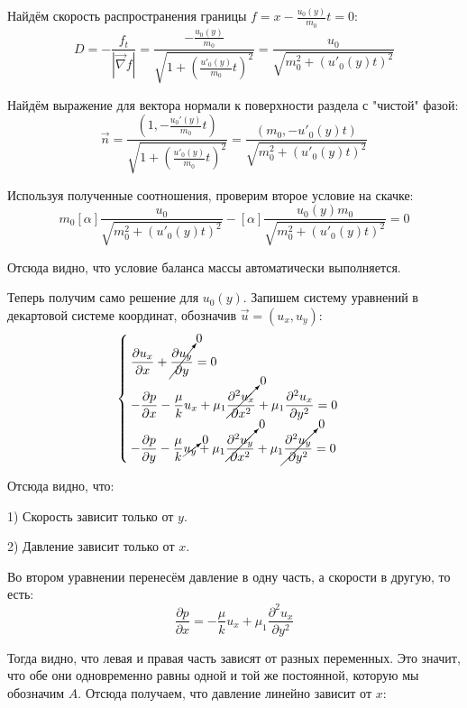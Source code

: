 \par Найдём скорость распространения границы $f = x-\frac{u_{0}(y)}{m_{0}}t=0$:
$$D=-\frac{f_{t}}{|\vec{\nabla}f|}=\frac{-\frac{u_{0}(y)}{m_{0}}}{\sqrt{1+(\frac{u'_{0}(y)}{m_{0}}t)^{2}}}=\frac{u_{0}}{\sqrt{m_{0}^{2}+(u'_{0}(y)t)^{2}}}$$
\par Найдём выражение для вектора нормали к поверхности раздела с "чистой" фазой:
$$\vec{n}=\frac{(1,-\frac{u_{0}'(y)}{m_{0}}t)}{\sqrt{1+(\frac{u'_{0}(y)}{m_{0}}t)^{2}}}=\frac{(m_{0}, -u'_{0}(y)t)}{\sqrt{m_{0}^{2}+(u'_{0}(y)t)^{2}}}$$
\par Используя полученные соотношения, проверим второе условие на скачке:
$$m_{0}[\alpha]\frac{u_{0}}{\sqrt{m_{0}^{2}+(u'_{0}(y)t)^{2}}}-[\alpha]\frac{u_{0}(y)m_{0}}{\sqrt{m_{0}^{2}+(u'_{0}(y)t)^{2}}}=0$$
\par Отсюда видно, что условие баланса массы автоматически выполняется.
\par Теперь получим само решение для $u_{0}(y)$. Запишем систему уравнений в декартовой системе координат, обозначив $\vec{u}=(u_{x}, u_{y})$:
\begin{equation*}
\begin{cases}
\displaystyle \frac{\partial u_{x}}{\partial x}+\cancelto{0}{\frac{\partial u_{y}}{\partial y}}=0\\
\displaystyle -\frac{\partial p}{\partial x}-\frac{\mu}{k}u_{x}+\mu_{1}\cancelto{0}{\frac{\partial^{2} u_{x}}{\partial x^{2}}}+\mu_{1}\frac{\partial^{2} u_{x}}{\partial y^{2}}=0\\
\displaystyle -\frac{\partial p}{\partial y}-\frac{\mu}{k}\cancelto{0}{u_{y}}+\mu_{1}\cancelto{0}{\frac{\partial^{2} u_{y}}{\partial x^{2}}}+\mu_{1}\cancelto{0}{\frac{\partial^{2} u_{y}}{\partial y^{2}}}=0\\
\end{cases}
\end{equation*}
\par Отсюда видно, что:\\
\par 1) Скорость зависит только от $y$.\\
\par 2) Давление зависит только от $x$.\\
\par Во втором уравнении перенесём давление в одну часть, а скорости в другую, то есть:
$$\frac{\partial p}{\partial x}=-\frac{\mu}{k}u_{x}+\mu_{1}\frac{\partial^{2} u_{x}}{\partial y^{2}}$$
\par Тогда видно, что левая и правая часть зависят от разных переменных. Это значит, что обе они одновременно равны одной и той же постоянной, которую мы обозначим $A$. Отсюда получаем, что давление линейно зависит от $x$:
